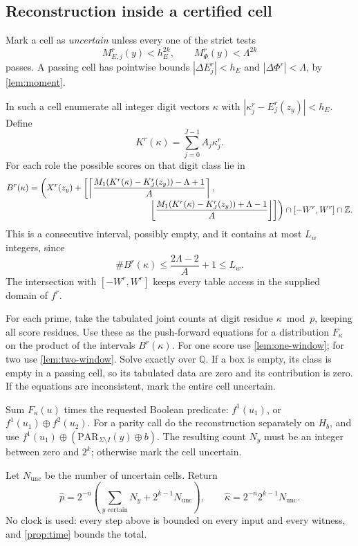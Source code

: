 \documentclass[11pt,letterpaper]{article}
\theoremstyle{definition}
\theoremstyle{remark}
\newcommand{\Q}{\mathbb Q}
\newcommand{\Z}{\mathbb Z}
\newcommand{\PAR}{\mathrm{PAR}}
\newcommand{\ceil}[1]{\left\lceil #1\right\rceil}
\newcommand{\floor}[1]{\left\lfloor #1\right\rfloor}
\newcommand{\abs}[1]{\left|#1\right|}
\newcommand{\phat}{\widehat p}
\newcommand{\khat}{\widehat\kappa}
\begin{document}
\subsection{Reconstruction inside a certified cell}

Mark a cell as \emph{uncertain} unless every one of the strict tests
\begin{equation}\label{eq:tests}
 M_{E,j}^r(y)<h_E^{2k},\qquad M_{\Phi}^r(y)<\Lambda^{2k}
\end{equation}
passes. A passing cell has pointwise bounds
\(\abs{\Delta E_j^r}<h_E\) and
\(\abs{\Delta\Phi^r}<\Lambda\), by \cref{lem:moment}.

In such a cell enumerate all integer digit vectors \(\kappa\) with
\(\abs{\kappa_j^r-E_j^r(z_y)}<h_E\). Define
\[
 K^r(\kappa)=\sum_{j=0}^{J-1}A_j\kappa_j^r.
\]
For each role the possible scores on that digit class lie in
\begin{align}
 B^r(\kappa)=\biggl(&X^r(z_y)+
 \biggl[
 \ceil{\frac{M_1(K^r(\kappa)-K_J^r(z_y))-\Lambda+1}{A}},\nonumber\\[-2pt]
 &\hspace{42mm}
 \floor{\frac{M_1(K^r(\kappa)-K_J^r(z_y))+\Lambda-1}{A}}
 \biggr]\biggr)\cap[-W^r,W^r]\cap\Z.             \label{eq:box}
\end{align}
This is a consecutive interval, possibly empty, and it contains at
most \(L_w\) integers, since
\[
 \#B^r(\kappa)\le\frac{2\Lambda-2}{A}+1\le L_w.
\]
The intersection with \([-W^r,W^r]\) keeps every table access in
the supplied domain of \(f^r\).

For each prime, take the tabulated joint counts at digit residue
\(\kappa\bmod p\), keeping all score residues. Use these as the
push-forward equations for a distribution \(F_\kappa\) on the
product of the intervals \(B^r(\kappa)\).
For one score use \cref{lem:one-window}; for two use
\cref{lem:two-window}. Solve exactly over \(\Q\).
If a box is empty, its class is empty in a passing cell, so its
tabulated data are zero and its contribution is zero.
If the equations are inconsistent, mark the entire cell uncertain.

Sum \(F_\kappa(u)\) times the requested Boolean predicate:
\(f^1(u_1)\), or \(f^1(u_1)\oplus f^2(u_2)\).
For a parity call do the reconstruction separately on \(H_b\), and
use \(f^1(u_1)\oplus(\PAR_{\Sigma\setminus I}(y)\oplus b)\).
The resulting count \(N_y\) must be an integer between zero and
\(2^k\); otherwise mark the cell uncertain.

Let \(N_{\mathrm{unc}}\) be the number of uncertain cells. Return
\begin{equation}\label{eq:output}
 \phat=2^{-n}\left(\sum_{y\text{ certain}}N_y+2^{k-1}N_{\mathrm{unc}}\right),
 \qquad \khat=2^{-n}2^{k-1}N_{\mathrm{unc}}.
\end{equation}
No clock is used: every step above is bounded on every input and every
witness, and \cref{prop:time} bounds the total.
\end{document}
